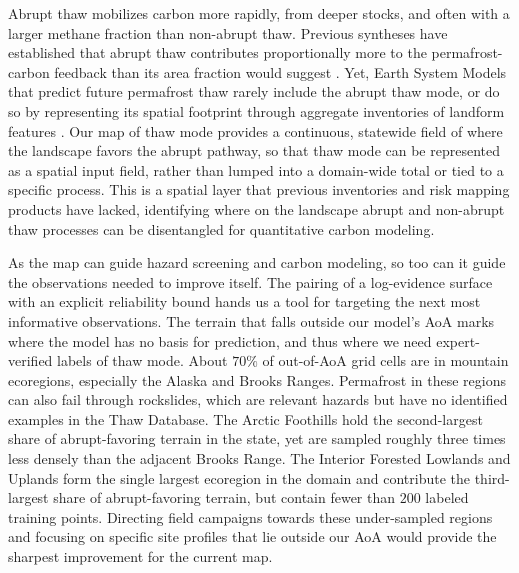 \documentclass[../main.tex]{subfiles}
\begin{document}
Abrupt thaw mobilizes carbon more rapidly, from deeper stocks, and often with a larger methane fraction than non-abrupt thaw. Previous syntheses have established that abrupt thaw contributes proportionally more to the permafrost-carbon feedback than its area fraction would suggest \citep{olefeldt2016circumpolar, walter201821st, turetsky2020carbon}. Yet, Earth System Models that predict future permafrost thaw rarely include the abrupt thaw mode, or do so by representing its spatial footprint through aggregate inventories of landform features \citep{nitzbon2020fast}. Our map of thaw mode provides a continuous, statewide field of where the landscape favors the abrupt pathway, so that thaw mode can be represented as a spatial input field, rather than lumped into a domain-wide total or tied to a specific process. This is a spatial layer that previous inventories and risk mapping products have lacked, identifying where on the landscape abrupt and non-abrupt thaw processes can be disentangled for quantitative carbon modeling.

As the map can guide hazard screening and carbon modeling, so too can it guide the observations needed to improve itself. The pairing of a log-evidence surface with an explicit reliability bound hands us a tool for targeting the next most informative observations. The terrain that falls outside our model's AoA marks where the model has no basis for prediction, and thus where we need expert-verified labels of thaw mode. About $70\%$ of out-of-AoA grid cells are in mountain ecoregions, especially the Alaska and Brooks Ranges. Permafrost in these regions can also fail through rockslides, which are relevant hazards but have no identified examples in the Thaw Database. The Arctic Foothills hold the second-largest share of abrupt-favoring terrain in the state, yet are sampled roughly three times less densely than the adjacent Brooks Range. The Interior Forested Lowlands and Uplands form the single largest ecoregion in the domain and contribute the third-largest share of abrupt-favoring terrain, but contain fewer than $200$ labeled training points. Directing field campaigns towards these under-sampled regions and focusing on specific site profiles that lie outside our AoA would provide the sharpest improvement for the current map.
\end{document}
